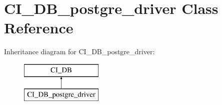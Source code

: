 \hypertarget{class_c_i___d_b__postgre__driver}{\section{C\-I\-\_\-\-D\-B\-\_\-postgre\-\_\-driver Class Reference}
\label{class_c_i___d_b__postgre__driver}
}
Inheritance diagram for C\-I\-\_\-\-D\-B\-\_\-postgre\-\_\-driver\-:\begin{figure}[H]
\begin{center}
\leavevmode
\includegraphics[height=2.000000cm]{class_c_i___d_b__postgre__driver}
\end{center}
\end{figure}
